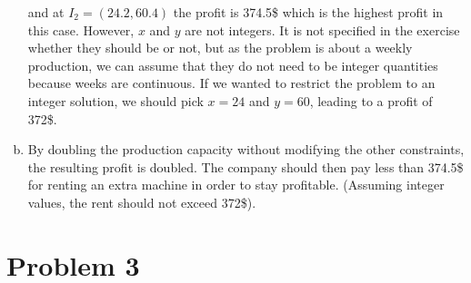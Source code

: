 \documentclass[a4paper, 10pt, twoside]{article}
\begin{document}
\begin{enumerate}[a)]
          and at $I_2 = (24.2, 60.4)$ the profit is 374.5\$ which is the highest profit in this case. However, $x$ and $y$ are not integers. It is not specified in the exercise whether they should be or not, but as the problem is about a weekly production, we can assume that they do not need to be integer quantities because weeks are continuous. If we wanted to restrict the problem to an integer solution, we should pick $x = 24$ and $y = 60$, leading to a profit of 372\$.

    \item By doubling the production capacity without modifying the other constraints, the resulting profit is doubled. The company should then pay less than 374.5\$ for renting an extra machine in order to stay profitable. (Assuming integer values, the rent should not exceed 372\$).
\end{enumerate}

\section*{Problem 3}
\end{document}
